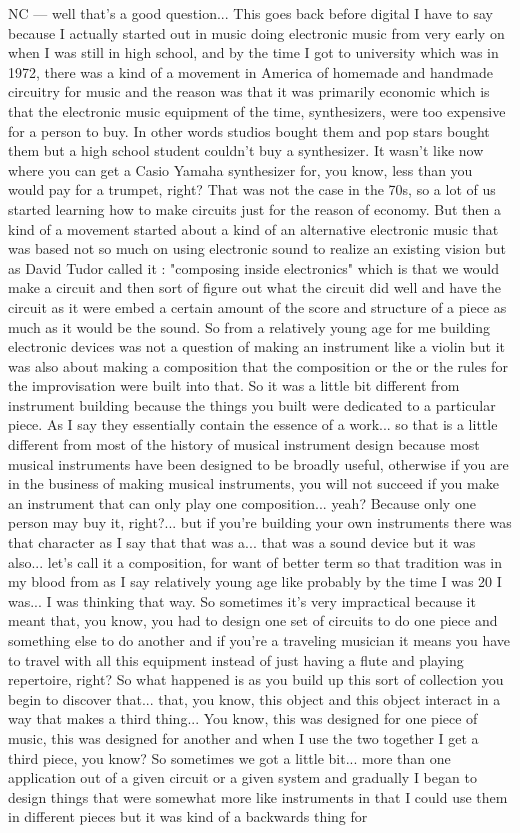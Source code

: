 NC — well that's a good question... This goes back before digital I have to say because I actually started out in music doing electronic music from very early on when I was still in high school, and by the time I got to university which was in 1972, there was a kind of a movement in America of homemade and handmade circuitry for music and the reason was that it was primarily economic which is that the electronic music equipment of the time, synthesizers, were too expensive for a person to buy. In other words studios bought them and pop stars bought them but a high school student couldn't buy a synthesizer. It wasn't like now where you can get a Casio Yamaha synthesizer for, you know, less than you would pay for a trumpet, right? That was not the case in the 70s, so a lot of us started learning how to make circuits just for the reason of economy. But then a kind of a movement started about a kind of an alternative electronic music that was based not so much on using electronic sound to realize an existing vision but as David Tudor called it : "composing inside electronics" which is that we would make a circuit and then sort of figure out what the circuit did well and have the circuit as it were embed a certain amount of the score and structure of a piece as much as it would be the sound. So from a relatively young age for me building electronic devices was not a question of making an instrument like a violin but it was also about making a composition that the composition or the or the rules for the improvisation were built into that. So it was a little bit different from instrument building because the things you built were dedicated to a particular piece. As I say they essentially contain the essence of a work... so that is a little different from most of the history of musical instrument design because most musical instruments have been designed to be broadly useful, otherwise if you are in the business of making musical instruments, you will not succeed if you make an instrument that can only play one composition... yeah? Because only one person may buy it, right?... but if you're building your own instruments there was that character as I say that that was a... that was a sound device but it was also... let's call it a composition, for want of better term so that tradition was in my blood from as I say relatively young age like probably by the time I was 20 I was... I was thinking that way. So sometimes it's very impractical because it meant that, you know, you had to design one set of circuits to do one piece and something else to do another and if you're a traveling musician it means you have to travel with all this equipment instead of just having a flute and playing repertoire, right? So what happened is as you build up this sort of collection you begin to discover that... that, you know, this object and this object interact in a way that makes a third thing... You know, this was designed for one piece of music, this was designed for another and when I use the two together I get a third piece, you know? So sometimes we got a little bit... more than one application out of a given circuit or a given system and gradually I began to design things that were somewhat more like instruments in that I could use them in different pieces but it was kind of a backwards thing for 